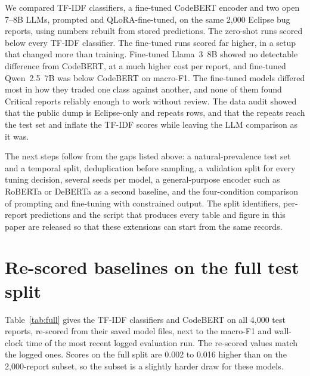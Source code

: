 \documentclass[a4paper,fleqn]{cas-sc}
\begin{document}
We compared TF-IDF classifiers, a fine-tuned CodeBERT encoder and two open 7--8B LLMs,
prompted and QLoRA-fine-tuned, on the same 2,000 Eclipse bug reports, using numbers
rebuilt from stored predictions. The zero-shot runs scored below every TF-IDF
classifier. The fine-tuned runs scored far higher, in a setup that changed more than
training. Fine-tuned Llama~3~8B showed no detectable difference from CodeBERT, at a much
higher cost per report, and fine-tuned Qwen~2.5~7B was below CodeBERT on macro-F1. The
fine-tuned models differed most in how they traded one class against another, and none
of them found Critical reports reliably enough to work without review. The data audit
showed that the public dump is Eclipse-only and repeats rows, and that the repeats reach
the test set and inflate the TF-IDF scores while leaving the LLM comparison as it was.

The next steps follow from the gaps listed above: a natural-prevalence test set and a
temporal split, deduplication before sampling, a validation split for every tuning
decision, several seeds per model, a general-purpose encoder such as RoBERTa or
DeBERTa as a second baseline, and the four-condition comparison of prompting and
fine-tuning with constrained output. The split identifiers, per-report predictions and
the script that produces every table and figure in this paper are released so that
these extensions can start from the same records.

\appendix
\section{Re-scored baselines on the full test split}
\label{app:full}

Table~\ref{tab:full} gives the TF-IDF classifiers and CodeBERT on all 4,000 test
reports, re-scored from their saved model files, next to the macro-F1 and wall-clock
time of the most recent logged evaluation run. The re-scored values match the logged
ones.
Scores on the full split are 0.002 to 0.016 higher than on the 2,000-report subset, so
the subset is a slightly harder draw for these models.

\begin{table}[width=\linewidth,cols=7,pos=h]
\caption{TF-IDF classifiers and CodeBERT on the full 4,000-report test split.}
\label{tab:full}
\small

\end{table}

\printcredits
\end{document}
